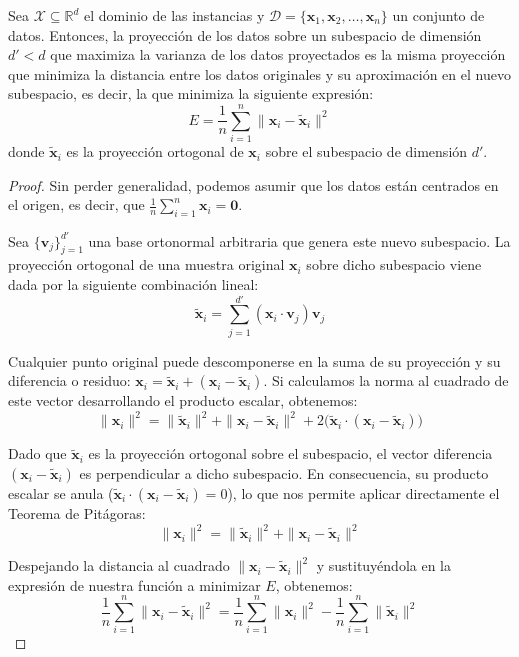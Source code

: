 \begin{theo}
    Sea $\mathcal{X} \subseteq \mathbb{R}^d$ el dominio de las instancias y $\mathcal{D} = \{\mathbf{x}_1, \mathbf{x}_2, \ldots, \mathbf{x}_n\}$ un conjunto de datos. Entonces, la proyección de los datos sobre un subespacio de dimensión $d' < d$ que maximiza la varianza de los datos proyectados es la misma proyección que minimiza la distancia entre los datos originales y su aproximación en el nuevo subespacio, es decir, la que minimiza la siguiente expresión: 
    $$E = \frac{1}{n} \sum_{i=1}^n \|\mathbf{x}_i - \tilde{\mathbf{x}}_i\|^2$$ 
    donde $\tilde{\mathbf{x}}_i$ es la proyección ortogonal de $\mathbf{x}_i$ sobre el subespacio de dimensión $d'$.
\end{theo}

\begin{proof}
    \linebreak
    Sin perder generalidad, podemos asumir que los datos están centrados en el origen, es decir, que $\frac{1}{n} \sum_{i=1}^n \mathbf{x}_i = \mathbf{0}$.

    Sea $\{\mathbf{v}_j\}_{j=1}^{d'}$ una base ortonormal arbitraria que genera este nuevo subespacio. La proyección ortogonal de una muestra original $\mathbf{x}_i$ sobre dicho subespacio viene dada por la siguiente combinación lineal: 
    $$\tilde{\mathbf{x}}_i = \sum_{j=1}^{d'} (\mathbf{x}_i \cdot \mathbf{v}_j) \mathbf{v}_j$$

    Cualquier punto original puede descomponerse en la suma de su proyección y su diferencia o residuo: $\mathbf{x}_i = \tilde{\mathbf{x}}_i + (\mathbf{x}_i - \tilde{\mathbf{x}}_i)$. Si calculamos la norma al cuadrado de este vector desarrollando el producto escalar, obtenemos:
    $$\|\mathbf{x}_i\|^2 = \|\tilde{\mathbf{x}}_i\|^2 + \|\mathbf{x}_i - \tilde{\mathbf{x}}_i\|^2 + 2\big(\tilde{\mathbf{x}}_i \cdot (\mathbf{x}_i - \tilde{\mathbf{x}}_i)\big)$$

    Dado que $\tilde{\mathbf{x}}_i$ es la proyección ortogonal sobre el subespacio, el vector diferencia $(\mathbf{x}_i - \tilde{\mathbf{x}}_i)$ es perpendicular a dicho subespacio. En consecuencia, su producto escalar se anula ($\tilde{\mathbf{x}}_i \cdot (\mathbf{x}_i - \tilde{\mathbf{x}}_i) = 0$), lo que nos permite aplicar directamente el Teorema de Pitágoras: 
    $$\|\mathbf{x}_i\|^2 = \|\tilde{\mathbf{x}}_i\|^2 + \|\mathbf{x}_i - \tilde{\mathbf{x}}_i\|^2$$

    Despejando la distancia al cuadrado $\|\mathbf{x}_i - \tilde{\mathbf{x}}_i\|^2$ y sustituyéndola en la expresión de nuestra función a minimizar $E$, obtenemos: 
    $$ \frac{1}{n} \sum_{i=1}^n \|\mathbf{x}_i - \tilde{\mathbf{x}}_i\|^2 = \frac{1}{n} \sum_{i=1}^n \|\mathbf{x}_i\|^2 - \frac{1}{n} \sum_{i=1}^n \|\tilde{\mathbf{x}}_i\|^2 $$


\end{proof}
